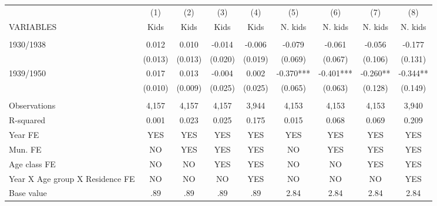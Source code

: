 \begin{tabular}{lcccccccc} \hline
 & (1) & (2) & (3) & (4) & (5) & (6) & (7) & (8) \\
VARIABLES & Kids & Kids & Kids & Kids & N. kids & N. kids & N. kids & N. kids \\ \hline
 &  &  &  &  &  &  &  &  \\
1930/1938 & 0.012 & 0.010 & -0.014 & -0.006 & -0.079 & -0.061 & -0.056 & -0.177 \\
 & (0.013) & (0.013) & (0.020) & (0.019) & (0.069) & (0.067) & (0.106) & (0.131) \\
1939/1950 & 0.017 & 0.013 & -0.004 & 0.002 & -0.370*** & -0.401*** & -0.260** & -0.344** \\
 & (0.010) & (0.009) & (0.025) & (0.025) & (0.065) & (0.063) & (0.128) & (0.149) \\
 &  &  &  &  &  &  &  &  \\
Observations & 4,157 & 4,157 & 4,157 & 3,944 & 4,153 & 4,153 & 4,153 & 3,940 \\
R-squared & 0.001 & 0.023 & 0.025 & 0.175 & 0.015 & 0.068 & 0.069 & 0.209 \\
Year FE & YES & YES & YES & YES & YES & YES & YES & YES \\
Mun. FE & NO & YES & YES & YES & NO & YES & YES & YES \\
Age class FE & NO & NO & YES & YES & NO & NO & YES & YES \\
Year X Age group X Residence FE & NO & NO & NO & YES & NO & NO & NO & YES \\
 Base value & .89 & .89 & .89 & .89 & 2.84 & 2.84 & 2.84 & 2.84 \\ \hline
\end{tabular}

